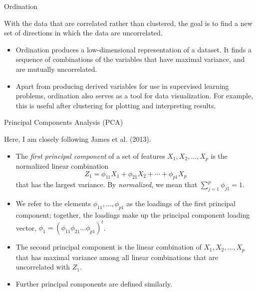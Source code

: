 \documentclass[
  ignorenonframetext,
]{beamer}
\providecommand{\tightlist}{%
  \setlength{\itemsep}{0pt}\setlength{\parskip}{0pt}}
\begin{document}
\begin{frame}{Ordination}
\protect\hypertarget{ordination}{}

With the data that are correlated rather than clustered, the goal is to
find a new set of directions in which the data are uncorrelated.

\begin{itemize}
\tightlist
\item
  Ordination produces a low-dimensional representation of a dataset. It
  finds a sequence of combinations of the variables that have maximal
  variance, and are mutually uncorrelated.
\item
  Apart from producing derived variables for use in supervised learning
  problems, ordination also serves as a tool for data visualization. For
  example, this is useful after clustering for plotting and interpreting
  results.
\end{itemize}

\end{frame}

\begin{frame}{Principal Components Analysis (PCA)}
\protect\hypertarget{principal-components-analysis-pca}{}

Here, I am closely following James et al. (2013).

\begin{itemize}
\item
  The \emph{first principal component} of a set of features
  \(X_1, X_2,\ldots, X_p\) is the normalized linear combination \[
  Z_1 = \phi_{11} X_1 + \phi_{21} X_2 + \cdots + \phi_{p1} X_p
  \] that has the largest variance. By \emph{normalized}, we mean that
  \(\sum_{j=1}^p \phi_{j1} = 1\).
\item
  We refer to the elements \(\phi_{11}, \ldots , \phi_{p1}\) as the
  loadings of the first principal component; together, the loadings make
  up the principal component loading vector,
  \(\phi_1 = (\phi_{11} \phi_{21} \ldots \phi_{p1} )^t\).
\item
  The second principal component is the linear combination of
  \(X_1, X_2,\ldots, X_p\) that has maximal variance among all linear
  combinations that are uncorrelated with \(Z_1\).
\item
  Further principal components are defined similarly.
\end{itemize}

\end{frame}
\end{document}
